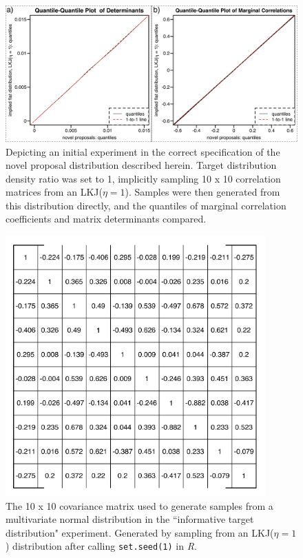 \begin{figure}[h]
\centering
\includegraphics[width=145mm]{figures/app_lkj1_samples.pdf}
\caption[Sampling from the Prior with a Novel Proposal Distribution]{Depicting an initial experiment in the correct specification of the novel proposal distribution described herein. Target distribution density ratio was set to 1, implicitly sampling 10 x 10 correlation matrices from an LKJ($\eta = 1$). Samples were then generated from this distribution directly, and the quantiles of marginal correlation coefficients and matrix determinants compared. \label{overflow}
\label{fig:priorSamplingResults}}
\end{figure}

\begin{figure}[h]
\centering
\includegraphics[width=100mm]{figures/appendix_correlationmatrix.pdf}
\caption[10 x 10 Correlation Matrix Used in Simulation Experiment]{The 10 x 10 covariance matrix used to generate samples from a multivariate normal distribution in the ``informative target distribution" experiment. Generated by sampling from an LKJ($\eta = 1$) distribution after calling \texttt{set.seed(1)} in \textit{R}. \label{fig:sample10x10CorrMatrix}
\label{overflow}}
\end{figure}


